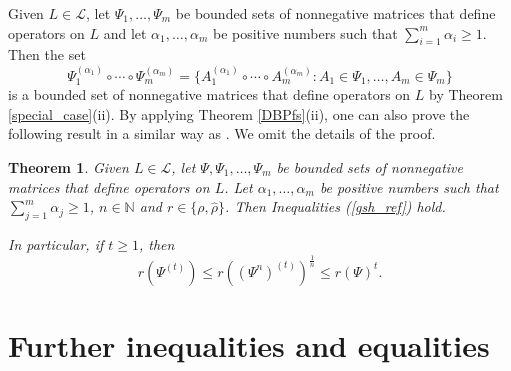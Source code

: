 \documentclass[12pt, reqno]{amsart}
\newtheorem{theorem}{Theorem}[section]
\theoremstyle{definition}
\theoremstyle{remark}
\numberwithin{equation}{section}
\newcommand{\be}{\begin{equation}}
\newcommand{\ee}{\end{equation}}
\newcommand{\NN}{\mathbb{N}}
\begin{document}
Given $L\in \mathcal{L}$, let  $\Psi _1, \ldots , \Psi _m$ be  bounded sets of nonnegative matrices that define operators on $L$ and let $\alpha _1, \ldots , \alpha _m$ be positive numbers such that
$\sum _{i=1} ^m \alpha _i \ge 1$. Then  the set
$$\Psi _1 ^{( \alpha _1)} \circ \cdots \circ \Psi _m ^{(\alpha _m)}=\{ A_1 ^{( \alpha _1)} \circ \cdots \circ A _m ^{(\alpha _m)}: A_1\in \Psi _1, \ldots, A_m \in \Psi _m \}$$
is a bounded set of   nonnegative matrices that define operators on $L$ by Theorem \ref{special_case}(ii).
By applying Theorem \ref{DBPfs}(ii), one can also prove the following result in a similar way as  \cite[Theorem 3.8]{P19}. We omit the details of the proof.
\begin{theorem}
\label{for_matrices}
Given $L\in\mathcal L$, let $\Psi, \Psi _1, \ldots , \Psi _m$ be bounded sets of nonnegative matrices that define operators on $L$. Let $\alpha_1, \ldots , \alpha _m$ be  positive numbers such that $\sum_{j=1}^{m}\alpha_j\ge1$, $n \in \NN$ and $r \in \{\rho, \hat{\rho}\}$. Then Inequalities (\ref{gsh_ref}) hold.

In particular, if $t\ge1$, then
\be
r (\Psi^{(t)})\le r((\Psi^n)^{(t)})^{\frac{1}{n}}\le r(\Psi)^{t}.
\label{folge}
\ee
\end{theorem}

\section{Further inequalities and equalities}
\end{document}
